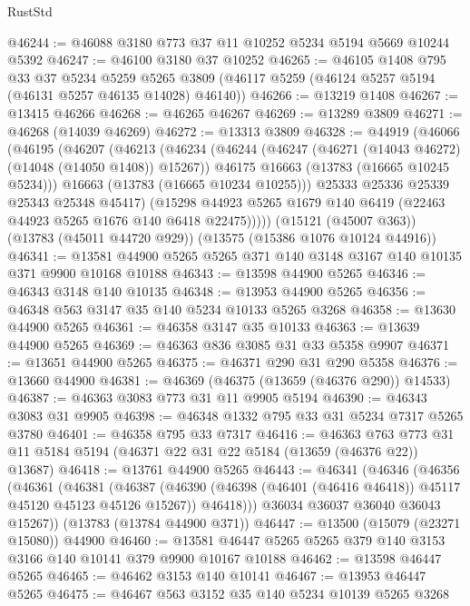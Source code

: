 \begin{lexlean}{RustStd}
\begin{coremodule}
@46244 := @46088 @3180 @773 @37 @11 @10252 @5234 @5194 @5669 @10244 @5392
@46247 := @46100 @3180 @37 @10252
@46265 := @46105
    @1408
    @795
    @33
    @37
    @5234
    @5259
    @5265
    @3809
    (@46117 @5259 (@46124 @5257 @5194 (@46131 @5257 @46135 @14028) @46140))
@46266 := @13219 @1408
@46267 := @13415 @46266
@46268 := @46265 @46267
@46269 := @13289 @3809
@46271 := @46268 (@14039 @46269)
@46272 := @13313 @3809
@46328 := @44919
    (@46066
      (@46195
        (@46207
          (@46213
            (@46234
              (@46244
                (@46247 (@46271 (@14043 @46272) (@14048 (@14050 @1408)) @15267))
                @46175
                @16663
                (@13783 (@16665 @10245 @5234)))
              @16663
              (@13783 (@16665 @10234 @10255)))
            @25333
            @25336
            @25339
            @25343
            @25348
            @45417)
          (@15298 @44923 @5265 @1679 @140 @6419 (@22463 @44923 @5265 @1676 @140 @6418 @22475)))))
    (@15121 (@45007 @363))
    (@13783 (@45011 @44720 @929))
    (@13575 (@15386 @1076 @10124 @44916))
@46341 := @13581 @44900 @5265 @5265 @371 @140 @3148 @3167 @140 @10135 @371 @9900 @10168 @10188
@46343 := @13598 @44900 @5265
@46346 := @46343 @3148 @140 @10135
@46348 := @13953 @44900 @5265
@46356 := @46348 @563 @3147 @35 @140 @5234 @10133 @5265 @3268
@46358 := @13630 @44900 @5265
@46361 := @46358 @3147 @35 @10133
@46363 := @13639 @44900 @5265
@46369 := @46363 @836 @3085 @31 @33 @5358 @9907
@46371 := @13651 @44900 @5265
@46375 := @46371 @290 @31 @290 @5358
@46376 := @13660 @44900
@46381 := @46369 (@46375 (@13659 (@46376 @290)) @14533)
@46387 := @46363 @3083 @773 @31 @11 @9905 @5194
@46390 := @46343 @3083 @31 @9905
@46398 := @46348 @1332 @795 @33 @31 @5234 @7317 @5265 @3780
@46401 := @46358 @795 @33 @7317
@46416 := @46363
    @763
    @773
    @31
    @11
    @5184
    @5194
    (@46371 @22 @31 @22 @5184 (@13659 (@46376 @22)) @13687)
@46418 := @13761 @44900 @5265
@46443 := @46341
    (@46346
      (@46356
        (@46361
          (@46381
            (@46387
              (@46390 (@46398 (@46401 (@46416 @46418)) @45117 @45120 @45123 @45126 @15267))
              @46418)))
        @36034
        @36037
        @36040
        @36043
        @15267))
    (@13783 (@13784 @44900 @371))
@46447 := @13500 (@15079 (@23271 @15080)) @44900
@46460 := @13581 @46447 @5265 @5265 @379 @140 @3153 @3166 @140 @10141 @379 @9900 @10167 @10188
@46462 := @13598 @46447 @5265
@46465 := @46462 @3153 @140 @10141
@46467 := @13953 @46447 @5265
@46475 := @46467 @563 @3152 @35 @140 @5234 @10139 @5265 @3268

\end{coremodule}
\end{lexlean}
